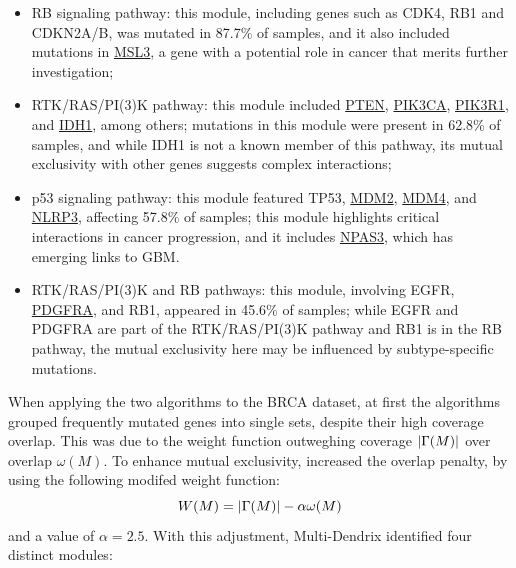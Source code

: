 \begin{itemize}
    \item RB signaling pathway: this module, including genes such as CDK4, RB1 and CDKN2A/B, was mutated in 87.7\% of samples, and it also included mutations in \href{https://www.ncbi.nlm.nih.gov/gene/10943}{MSL3}, a gene with a potential role in cancer that merits further investigation;
    \item RTK/RAS/PI(3)K pathway: this module included \href{https://www.ncbi.nlm.nih.gov/gene/5728}{PTEN}, \href{https://www.ncbi.nlm.nih.gov/gene/5290}{PIK3CA}, \href{https://en.wikipedia.org/wiki/PIK3R1}{PIK3R1}, and \href{https://www.ncbi.nlm.nih.gov/gene/3417}{IDH1}, among others; mutations in this module were present in 62.8\% of samples, and while IDH1 is not a known member of this pathway, its mutual exclusivity with other genes suggests complex interactions;
    \item p53 signaling pathway: this module featured TP53, \href{https://www.ncbi.nlm.nih.gov/gene/4193}{MDM2}, \href{https://www.ncbi.nlm.nih.gov/gene/4194}{MDM4}, and \href{https://www.ncbi.nlm.nih.gov/gene/114548}{NLRP3}, affecting 57.8\% of samples; this module highlights critical interactions in cancer progression, and it includes \href{https://www.ncbi.nlm.nih.gov/gene/64067}{NPAS3}, which has emerging links to GBM.
    \item RTK/RAS/PI(3)K and RB pathways: this module, involving EGFR, \href{https://www.ncbi.nlm.nih.gov/gene/5156}{PDGFRA}, and RB1, appeared in 45.6\% of samples; while EGFR and PDGFRA are part of the RTK/RAS/PI(3)K pathway and RB1 is in the RB pathway, the mutual exclusivity here may be influenced by subtype-specific mutations.
\end{itemize}

When applying the two algorithms to the BRCA dataset, at first the algorithms grouped frequently mutated genes into single sets, despite their high coverage overlap. This was due to the weight function outweghing coverage $\left|\Gamma(M)\right|$ over overlap $\omega(M)$. To enhance mutual exclusivity, \textcite{multi-dendrix} increased the overlap penalty, by using the following modifed weight function: $$W(M) = \left|\Gamma(M)\right| - \alpha \omega(M)$$ and a value of $\alpha = 2.5$. With this adjustment, Multi-Dendrix identified four distinct modules:

